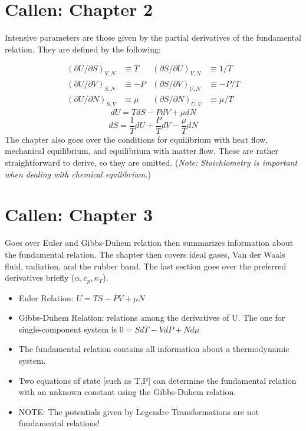 \section{Callen: Chapter 2}

Intensive parameters are those given by the partial derivatives of the fundamental relation. They are defined by the following:

\begin{align*}
    (\partial U/\partial S)_{V,N} & \equiv  T & (\partial S/\partial U)_{V,N} & \equiv  1/T \\ 
    (\partial U/\partial V)_{S,N} & \equiv -P & (\partial S/\partial V)_{U,N} & \equiv -P/T \\ 
    (\partial U/\partial N)_{S,V} & \equiv \mu & (\partial S/\partial N)_{U,V} & \equiv \mu/T
\end{align*}
\begin{equation}
    dU = TdS-PdV+\mu dN
\end{equation}
\begin{equation}
    dS = \frac{1}{T} dU + \frac{P}{T} dV - \frac{\mu}{T} dN
\end{equation}
The chapter also goes over the conditions for equilibrium with heat flow, mechanical equilibrium, and equilibrium with matter flow. These are rather straightforward to derive, so they are omitted. (\emph{Note: Stoichiometry is important when dealing with chemical equilibrium.})

\section{Callen: Chapter 3}
Goes over Euler and Gibbs-Duhem relation then summarizes information about the fundamental relation. The chapter then covers ideal gases, Van der Waals fluid, radiation, and the rubber band. The last section goes over the preferred derivatives briefly ($\alpha, c_p, \kappa_T$).
\begin{itemize}
    \item Euler Relation: $U=TS-PV+\mu N$
    \item Gibbs-Duhem Relation: relations among the derivatives of U. The one for single-component system is $0 = S dT - V dP + N d\mu $
    \item The fundamental relation contains all information about a thermodynamic system.
    \item Two equations of state [such as T,P] can determine the fundamental relation with an unknown constant using the Gibbs-Duhem relation.
    \item NOTE: The potentials given by Legendre Transformations are not fundamental relations!
\end{itemize}


